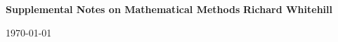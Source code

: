 \begin{titlepage}

    \begin{center}

        \vspace*{1cm}
        \Huge
        \textbf{Supplemental Notes on Mathematical Methods}
        \LARGE
        \vfill
        \textbf{Richard Whitehill}

        \Large
        \vspace{0.5cm}
        \today


    \end{center}
    
\end{titlepage}
